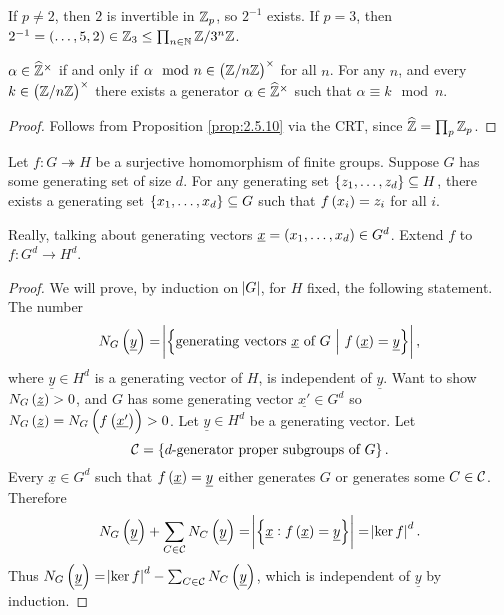 \begin{example}
If $ p \ne 2 $, then $ 2 $ is invertible in $ \mathbb{Z}_p $, so $ 2^{-1} $ exists. If $ p = 3 $, then $ 2^{-1} = \br{\dots, 5, 2} \in \ZZ_3 \le \prod_{n \in \NN} \ZZ / 3^n\ZZ $.
\end{example}

\begin{proposition}
$ \alpha \in \widehat{\mathbb{Z}}^\times $ if and only if $ \alpha \mod n \in \br{\ZZ / n\ZZ}^\times $ for all $ n $. For any $ n $, and every $ k \in \br{\ZZ / n\ZZ}^\times $ there exists a generator $ \alpha \in \widehat{\mathbb{Z}}^\times $ such that $ \alpha \equiv k \mod n $.
\end{proposition}

\begin{proof}
Follows from Proposition \ref{prop:2.5.10} via the CRT, since $ \widehat{\mathbb{Z}} = \prod_p \mathbb{Z}_p $.
\end{proof}

\begin{theorem}
Let $ f : G \twoheadrightarrow H $ be a surjective homomorphism of finite groups. Suppose $ G $ has some generating set of size $ d $. For any generating set $ \cbr{z_1, \dots, z_d} \subseteq H $, there exists a generating set $ \cbr{x_1, \dots, x_d} \subseteq G $ such that $ f\br{x_i} = z_i $ for all $ i $.
\end{theorem}

Really, talking about generating vectors $ \underline{x} = \br{x_1, \dots, x_d} \in G^d $. Extend $ f $ to $ f : G^d \to H^d $.

\begin{proof}
We will prove, by induction on $ \abs{G} $, for $ H $ fixed, the following statement. The number
$$ N_G\br{\underline{y}} = \abs{\cbr{\text{generating vectors} \ \underline{x} \ \text{of} \ G \st f\br{\underline{x}} = \underline{y}}}, $$
where $ \underline{y} \in H^d $ is a generating vector of $ H $, is independent of $ \underline{y} $. Want to show $ N_G\br{\underline{z}} > 0 $, and $ G $ has some generating vector $ \underline{x'} \in G^d $ so $ N_G\br{\underline{z}} = N_G\br{f\br{\underline{x'}}} > 0 $. Let $ \underline{y} \in H^d $ be a generating vector. Let
$$ \CCC = \cbr{\text{$ d $-generator proper subgroups of} \ G}. $$
Every $ \underline{x} \in G^d $ such that $ f\br{\underline{x}} = \underline{y} $ either generates $ G $ or generates some $ C \in \mathcal{C} $. Therefore
$$ N_G\br{\underline{y}} + \sum_{C \in \CCC} N_C\br{\underline{y}} = \abs{\cbr{\underline{x} : f\br{\underline{x}} = \underline{y}}} = \abs{\ker f}^d. $$
Thus $ N_G\br{\underline{y}} = \abs{\ker f}^d - \sum_{C \in \CCC} N_C\br{\underline{y}} $, which is independent of $ \underline{y} $ by induction.
\end{proof}

